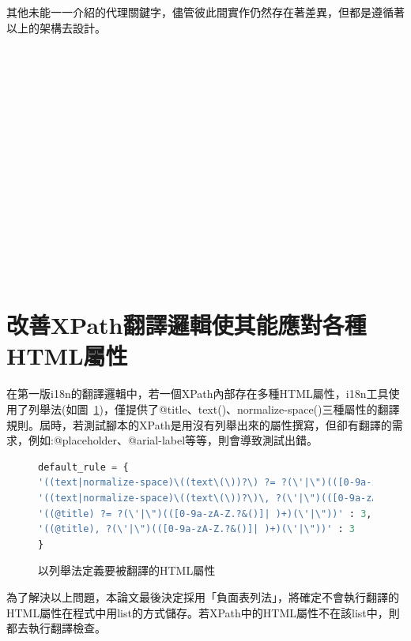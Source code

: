 其他未能一一介紹的代理關鍵字，儘管彼此間實作仍然存在著差異，但都是遵循著以上的架構去設計。


\hspace*{\fill} \\
\\ \hspace*{\fill} \\
\\ \hspace*{\fill} \\
\\ \hspace*{\fill} \\
\\ \hspace*{\fill} \\
\\ \hspace*{\fill} \\
\\ \hspace*{\fill} \\
\\ \hspace*{\fill} \\
\section{改善XPath翻譯邏輯使其能應對各種HTML屬性}
在第一版i18n的翻譯邏輯中，若一個XPath內部存在多種HTML屬性，i18n工具使用了列舉法(如圖~\ref{以列舉法定義要被翻譯的HTML屬性})，僅提供了@title、text()、normalize-space()三種屬性的翻譯規則。屆時，若測試腳本的XPath是用沒有列舉出來的屬性撰寫，但卻有翻譯的需求，例如:@placeholder、@arial-label等等，則會導致測試出錯。

\begin{figure}[H]
\begin{lstlisting}[language={python}]
default_rule = {
'((text|normalize-space)\((text\(\))?\) ?= ?(\'|\")(([0-9a-zA-Z.?&()]| )+)(\'|\"))': 4,
'((text|normalize-space)\((text\(\))?\)\, ?(\'|\")(([0-9a-zA-Z.?&()]| )+)(\'|\"))': 4,
'((@title) ?= ?(\'|\")(([0-9a-zA-Z.?&()]| )+)(\'|\"))' : 3,
'((@title), ?(\'|\")(([0-9a-zA-Z.?&()]| )+)(\'|\"))' : 3
}
\end{lstlisting}
\caption{以列舉法定義要被翻譯的HTML屬性}
\label{以列舉法定義要被翻譯的HTML屬性}
\end{figure}

為了解決以上問題，本論文最後決定採用「負面表列法」，將確定不會執行翻譯的HTML屬性在程式中用list的方式儲存。若XPath中的HTML屬性不在該list中，則都去執行翻譯檢查。

